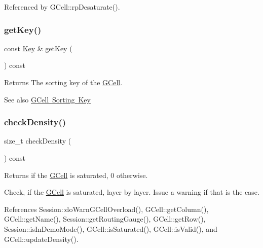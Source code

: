 Referenced by G\+Cell\+::rp\+Desaturate().

\mbox{\label{classKatabatic_1_1GCell_ade1e79e88bf4f4c173ffd083dd5470c9}} 
\subsubsection{\texorpdfstring{get\+Key()}{getKey()}}
{\footnotesize\ttfamily const \mbox{\hyperlink{classKatabatic_1_1GCell_1_1Key}{Key}} \& get\+Key (\begin{DoxyParamCaption}{ }\end{DoxyParamCaption}) const\hspace{0.3cm}{\ttfamily [inline]}}

\begin{DoxyReturn}{Returns}
The sorting key of the \mbox{\hyperlink{classKatabatic_1_1GCell}{G\+Cell}}.
\end{DoxyReturn}
\begin{DoxySeeAlso}{See also}
\mbox{\hyperlink{classKatabatic_1_1GCell_secGCellSortingKey}{G\+Cell Sorting Key}} 
\end{DoxySeeAlso}
\mbox{\label{classKatabatic_1_1GCell_a88208864ba2268689946a8cb7a86fcb2}} 
\subsubsection{\texorpdfstring{check\+Density()}{checkDensity()}}
{\footnotesize\ttfamily size\+\_\+t check\+Density (\begin{DoxyParamCaption}{ }\end{DoxyParamCaption}) const}

\begin{DoxyReturn}{Returns}
{} if the \mbox{\hyperlink{classKatabatic_1_1GCell}{G\+Cell}} is saturated, 0 otherwise.
\end{DoxyReturn}
Check, if the \mbox{\hyperlink{classKatabatic_1_1GCell}{G\+Cell}} is saturated, layer by layer. Issue a warning if that is the case. 

References Session\+::do\+Warn\+G\+Cell\+Overload(), G\+Cell\+::get\+Column(), G\+Cell\+::get\+Name(), Session\+::get\+Routing\+Gauge(), G\+Cell\+::get\+Row(), Session\+::is\+In\+Demo\+Mode(), G\+Cell\+::is\+Saturated(), G\+Cell\+::is\+Valid(), and G\+Cell\+::update\+Density().



